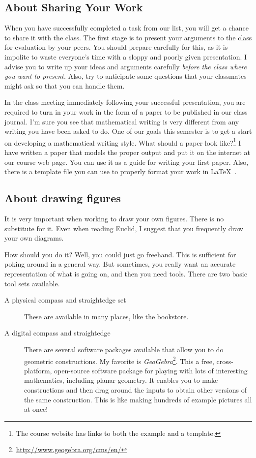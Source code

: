 \subsection*{About Sharing Your Work}
When you have successfully completed a task from our list, you will get a chance to share it with the class.
The first stage is to present your arguments to the class for evaluation by your peers.
You should prepare carefully for this, as it is impolite to waste everyone's time with a sloppy and poorly given presentation.
I advise you to write up your ideas and arguments carefully \emph{before the class where you want to present.}
Also, try to anticipate some questions that your classmates might ask so that you can handle them.




In the class meeting immediately following your successful presentation, you are required to turn in your work in the form of a paper to be published in our class journal.
I'm sure you see that mathematical writing is very different from any writing you have been asked to do.
One of our goals this semester is to get a start on developing a mathematical writing style.
What should a paper look like?\footnote{The course website has links to both the example and a template.}
I have written a paper that models the proper output and put it on the internet at our course web page.
You can use it as a guide for writing your first paper.
Also, there is a template file you can use to properly format your work in \LaTeX\ .


\subsection*{About drawing figures}
It is very important when working to draw your own figures.
There is no substitute for it.
Even when reading Euclid, I suggest that you frequently draw your own diagrams.

How should you do it?
Well, you could just go freehand.
This is sufficient for poking around in a general way.
But sometimes, you really want an accurate representation of what is going on, and then you need tools.
There are two basic tool sets available.
\begin{description}
\item[A physical compass and straightedge set] These are available in many places, like the bookstore.
\item[A digital compass and straightedge] There are several software packages available that allow you to do geometric constructions.
My favorite is \emph{GeoGebra}\footnote{\url{http://www.geogebra.org/cms/en/}}.
This a free, cross-platform, open-source software package for playing with lots of interesting mathematics, including planar geometry.
It enables you to make constructions and then drag around the inputs to obtain other versions of the same construction.
This is like making hundreds of example pictures all at once!
\end{description}

